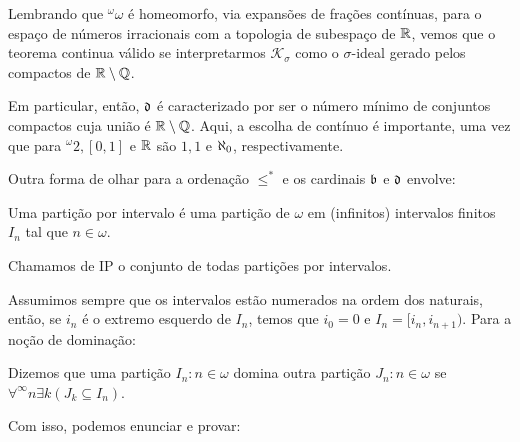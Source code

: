 Lembrando que $^\omega\omega$ é homeomorfo, via expansões de frações contínuas, para o espaço de números irracionais com a topologia de subespaço de $\mathbb{R}$, vemos que o teorema continua válido se interpretarmos $\mathcal K_\sigma$ como o $\sigma$-ideal gerado pelos compactos de $\mathbb{R}\setminus \mathbb{Q}$. 

Em particular, então, $\mathfrak{d}$ é caracterizado por ser o número mínimo de conjuntos compactos cuja união é $\mathbb{R}\setminus\mathbb{Q}$. Aqui, a escolha de contínuo é importante, uma vez que para $^\omega 2, [0,1]$ e $\mathbb{R}$ são $1,1$ e $\aleph_0$, respectivamente. 

Outra forma de olhar para a ordenação $\leq^*$ e os cardinais $\mathfrak{b}$ e $\mathfrak{d}$ envolve:

\begin{definition}
    Uma partição por intervalo é uma partição de $\omega$ em (infinitos) intervalos finitos $I_n$ tal que $n\in\omega$.

    Chamamos de IP o conjunto de todas partições por intervalos. 
\end{definition}

Assumimos sempre que os intervalos estão numerados na ordem dos naturais, então, se $i_n$ é o extremo esquerdo de $I_n$, temos que $i_0 = 0$ e $I_n = [i_n, i_{n+1})$. Para a noção de dominação:

\begin{definition}
    Dizemos que uma partição ${I_n : n\in\omega}$ domina outra partição ${J_n : n\in\omega}$ se $\forall^\infty n \exists k (J_k \subseteq I_n)$. 
\end{definition}

Com isso, podemos enunciar e provar:

